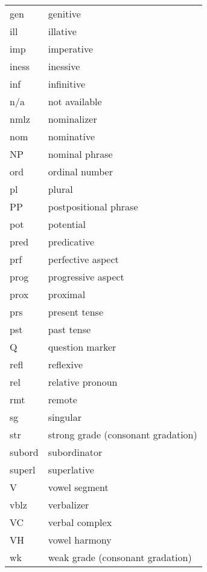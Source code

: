 \begin{longtable}{ll}
{gen}	& genitive \\
{ill}	& illative \\
{imp}	& imperative \\
{iness}	& inessive \\
{inf}	& infinitive \\
n/a	& not available \\
{nmlz}	& nominalizer \\
{nom}	& nominative \\
NP&nominal phrase\\
{ord}	& ordinal number \\
{pl}	& plural \\
PP&postpositional phrase\\
{pot}	& potential \\
{pred} & predicative\\
{prf}	& perfective aspect \\
{prog}	& progressive aspect \\
{prox}	& proximal \\
{prs}	& present tense \\
{pst}	& past tense \\
{Q}	& question marker \\
{refl}	& reflexive\\
{rel}	& relative pronoun \\
{rmt}	& remote \\
{sg}	& singular \\
str		&strong grade (consonant gradation) \\
{subord}& subordinator \\
{superl}& superlative \\
V		&vowel segment\\
{vblz}	& verbalizer \\
VC		&verbal complex\\
VH		&vowel harmony\\
wk		&weak grade (consonant gradation) \\
\end{longtable}

